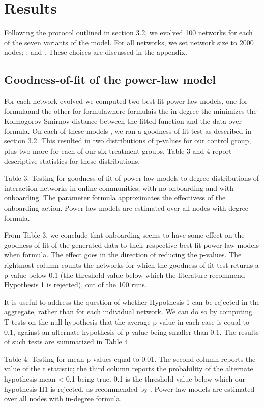 
\section{Results}
Following the protocol outlined in section 3.2, we evolved 100 networks for each of the seven variants of the model. For all networks, we set network size to 2000 nodes; ; and . These choices are discussed in the appendix.

\subsection{Goodness-of-fit of the power-law model}

For each network evolved we computed two best-fit power-law models, one for formulaand the other for formulawhere formulais the in-degree the minimizes the Kolmogorov-Smirnov distance between the fitted function and the data over formula. On each of these models , we ran a goodness-of-fit test as described in section 3.2. This resulted in two distributions of p-values for our control group, plus two more for each of our six treatment groups. Table 3 and 4 report descriptive statistics for these distributions.

Table 3: Testing for goodness-of-fit of power-law models to degree distributions of interaction networks in online communities, with no onboarding and with onboarding. The parameter formula approximates the effectivess of the onboarding action. Power-law models are estimated over all nodes with degree formula.

From Table 3, we conclude that onboarding seems to have some effect on the goodness-of-fit of the generated data to their respective best-fit power-law models when formula. The effect goes in the direction of reducing the p-values. The rightmost column counts the networks for which the goodness-of-fit test returns a p-value below 0.1 (the threshold value below which the literature recommend Hypothesis 1 is rejected), out of the 100 runs. 

It is useful to address the question of whether Hypothesis 1 can be rejected in the aggregate, rather than for each individual network. We can do so by computing T-tests on the null hypothesis that the average p-value in each case is equal to 0.1, against an alternate hypothesis of p-value being smaller than 0.1. The results of such tests are summarized in Table 4.

Table 4: Testing for mean p-values equal to 0.01. The second column reports the value of the t statistic; the third column reports the probability of the alternate hypothesis mean < 0.1 being true. 0.1 is the threshold value below which our hypothesis H1 is rejected, as recommended by \cite{clauset2009power}. Power-law models are estimated over all nodes with in-degree formula.

